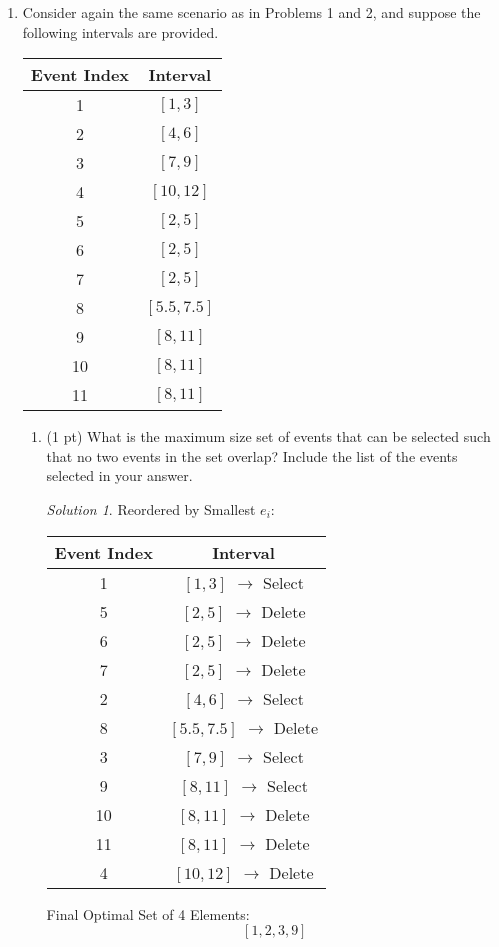 \documentclass[12pt]{article}
\theoremstyle{remark}
\newtheorem*{solution}{Solution}
\begin{document}
\begin{enumerate}
\begin{enumerate}[label=(\alph*)]
\end{enumerate}

\newpage
\item Consider again the same scenario as in Problems 1 and 2, and suppose the following intervals are provided.
\begin{center}
\begin{tabular}{c|c}
Event Index & Interval \\ \hline
1 & $[1, 3]$ \\ 
2 & $[4, 6]$ \\
3 & $[7, 9]$ \\
4 & $[10, 12]$ \\
5 & $[2, 5]$ \\
6 & $[2, 5]$ \\
7 & $[2, 5]$ \\
8 & $[5.5, 7.5]$ \\
9 & $[8, 11]$ \\
10 & $[8, 11]$ \\
11 & $[8, 11]$ \\
\end{tabular}
\end{center}

\begin{enumerate}[label=(\alph*)]
\item  (1 pt) What is the maximum size set of events that can be selected such that no two events in the set overlap? Include the list of the events selected in your answer.
\begin{solution}
Reordered by Smallest $e_i$:
\begin{center}
\begin{tabular}{c|c}
Event Index & Interval \\ \hline
1 & $[1, 3]$ $\rightarrow$ Select\\ 
5 & $[2, 5]$ $\rightarrow$ Delete\\
6 & $[2, 5]$ $\rightarrow$ Delete\\
7 & $[2, 5]$ $\rightarrow$ Delete\\
2 & $[4, 6]$ $\rightarrow$ Select\\
8 & $[5.5, 7.5]$ $\rightarrow$ Delete\\
3 & $[7, 9]$ $\rightarrow$ Select\\
9 & $[8, 11]$ $\rightarrow$ Select\\
10 & $[8, 11]$ $\rightarrow$ Delete\\
11 & $[8, 11]$ $\rightarrow$ Delete\\
4 & $[10, 12]$ $\rightarrow$ Delete\\
\end{tabular}
\end{center}
Final Optimal Set of 4 Elements: $$[1,2,3,9]$$
\end{solution}


\end{enumerate}
\end{enumerate}
\end{document}
